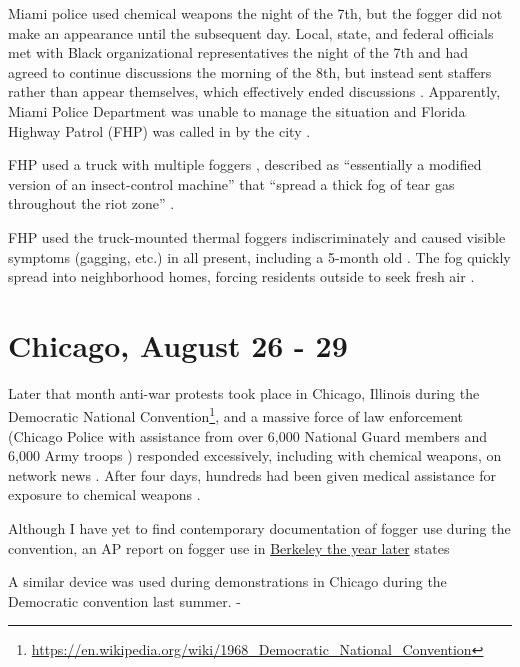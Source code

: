 \documentclass[
  12pt,
]{krantz}
\renewenvironment{quote}{\begin{VF}}{\end{VF}}
\renewcommand{\href}[2]{#2\footnote{\url{#1}}}
\begin{document}
Miami police used chemical weapons the night of the 7th, but the fogger did not make an appearance until the subsequent day.
Local, state, and federal officials met with Black organizational representatives the night of the 7th and had agreed to continue discussions the morning of the 8th, but instead sent staffers rather than appear themselves, which effectively ended discussions \citep{Tschenschlok1995, Tschenschlok1996}.
Apparently, Miami Police Department was unable to manage the situation and Florida Highway Patrol (FHP) was called in by the city \citep{Tschenschlok1995}.

FHP used a truck with multiple foggers \citep{Lorentzen2018}, described as ``essentially a modified version of an insect-control machine'' that ``spread a thick fog of tear gas throughout the riot zone'' \citep{Tschenschlok1995}.

FHP used the truck-mounted thermal foggers indiscriminately and caused visible symptoms (gagging, etc.) in all present, including a 5-month old \citep{McArdle2018}.
The fog quickly spread into neighborhood homes, forcing residents outside to seek fresh air \citep{Tschenschlok1995}.

\hypertarget{ChicagoIL1968_08_26}{%
\section*{Chicago, August 26 - 29}\label{ChicagoIL1968_08_26}}


Later that month anti-war protests took place in Chicago, Illinois during the \href{https://en.wikipedia.org/wiki/1968_Democratic_National_Convention}{Democratic National Convention}, and a massive force of law enforcement (Chicago Police with assistance from over 6,000 National Guard members and 6,000 Army troops \citep{TaylorandMorris2018}) responded excessively, including with chemical weapons, on network news \citep{Schultz1969, Karnow1983, Farber1988, Langguth2000}.
After four days, hundreds had been given medical assistance for exposure to chemical weapons \citep{TaylorandMorris2018}.

Although I have yet to find contemporary documentation of fogger use during the convention, an AP report on fogger use in \protect\hyperlink{BerkeleyCA1969_02_21}{Berkeley the year later} states

\begin{quote}
A similar device was used during demonstrations in Chicago during the Democratic convention last summer. - \citet{TheDailyTribune1969_02_21}
\end{quote}
\end{document}
